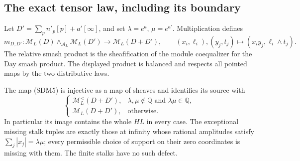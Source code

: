 \subsection{The exact tensor law, including its boundary}
Let $D'=\sum_p n'_p[p]+a'[\infty]$, and set
$\lambda=e^a$, $\mu=e^{a'}$. Multiplication defines
\begin{equation}\tag{SDM5}
 m_{D,D'}:\mathcal M_L(D)\wedge_{\mathcal A_L}\mathcal M_L(D')
 \longrightarrow\mathcal M_L(D+D'),\qquad
 (x_i,\ell_i),(y_j,t_j)\longmapsto(x_i y_j,\ell_i\wedge t_j).
\end{equation}
The relative smash product is the sheafification of the module
coequalizer for the Day smash product. The displayed product is
balanced and respects all pointed maps by the two distributive laws.

\begin{theorem}\label{SDM:tensor}
The map (SDM5) is injective as a map of sheaves and identifies its
source with
\begin{equation}\tag{SDM6}
 \begin{cases}
 \mathcal M_L^{<}(D+D'),&\lambda,\mu\notin\mathbb Q
                             \text{ and }\lambda\mu\in\mathbb Q,\\
 \mathcal M_L(D+D'),&\text{otherwise}.
 \end{cases}
\end{equation}
In particular its image contains the whole $HL$ in every case.
The exceptional missing stalk tuples are exactly those at infinity
whose rational amplitudes satisfy $\sum_j|x_j|=\lambda\mu$;
every permissible choice of support on their zero coordinates is
missing with them. The finite stalks have no such defect.
\end{theorem}
